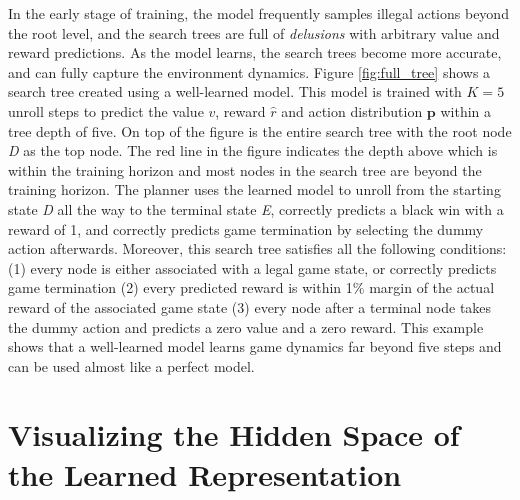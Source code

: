 In the early stage of training, the model frequently samples illegal actions beyond the root level, and the search trees are full of \textit{delusions} with arbitrary value and reward predictions.
As the model learns, the search trees become more accurate, and can fully capture the environment dynamics.
Figure \ref{fig:full_tree} shows a search tree created using a well-learned model.
This model is trained with $K = 5$ unroll steps to predict the value \(v\), reward \(\hat{r}\) and action distribution \(\mathbf{p}\) within a tree depth of five.
On top of the figure is the entire search tree with the root node \textit{D} as the top node.
The red line in the figure indicates the depth above which is within the training horizon and most nodes in the search tree are beyond the training horizon.
The planner uses the learned model to unroll from the starting state \textit{D} all the way to the terminal state \textit{E}, correctly predicts a black win with a reward of 1, and correctly predicts game termination by selecting the dummy action afterwards.
Moreover, this search tree satisfies all the following conditions: (1) every node is either associated with a legal game state, or correctly predicts game termination (2) every predicted reward is within 1\% margin of the actual reward of the associated game state (3) every node after a terminal node takes the dummy action and predicts a zero value and a zero reward.
This example shows that a well-learned model learns game dynamics far beyond five steps and can be used almost like a perfect model.


\section{Visualizing the Hidden Space of the Learned Representation} \label{sec:exp:tsne}


